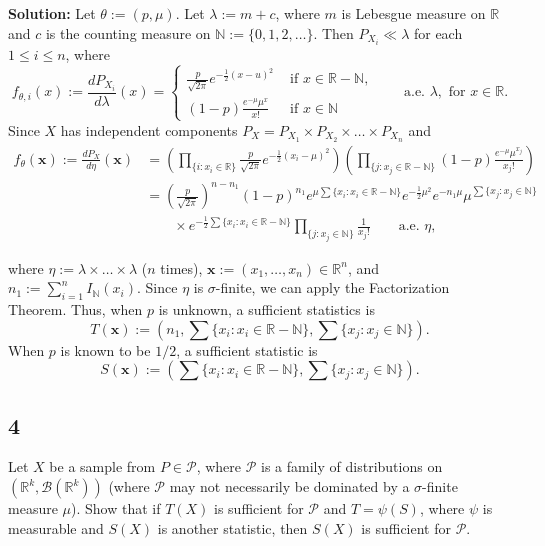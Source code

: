 \documentclass[12pt]{article}
\begin{document}
{\bf Solution:}
Let $\theta := (p, \mu)$. Let $\lambda := m + c$, where $m$ is Lebesgue measure on $\mathbb{R}$ and $c$ is the counting measure on $\mathbb{N} := \{0, 1, 2, \dots\}$.
Then $P_{X_{i}} \ll \lambda$ for each $1 \leq i \leq n$, where 
\[
  f_{\theta, i}(x) := \frac{dP_{X_{i}}}{d\lambda}(x) = \left\{ \begin{array}{cl} 
      \frac{p}{\sqrt{2\pi}}e^{-\frac{1}{2}(x-u)^{2}} & \text{ if } x \in \mathbb{R} - \mathbb{N}, \\
      (1-p)\frac{e^{-\mu}\mu^{x}}{x!} & \text{ if } x \in \mathbb{N}
  \end{array} \right. \qquad \text{a.e. }\lambda, \text{ for }x \in \mathbb{R}.
\]
Since $X$ has independent components $P_{X} = P_{X_{1}} \times P_{X_{2}} \times \dots \times P_{X_{n}}$ and 
\begin{align*}
  f_{\theta}(\bm{x}) := \frac{dP_{X}}{d\eta}(\bm{x}) & = \left( \prod_{\{i : x_{i} \in \mathbb{R}\}}\frac{p}{\sqrt{2\pi}}e^{-\frac{1}{2}(x_{i} -
  \mu)^{2}} \right)
  \left( \prod_{\{j : x_{j} \in \mathbb{R}-\mathbb{N}\}}(1-p)\frac{e^{-\mu}\mu^{x_{j}}}{x_{j}!} \right) \\
  & = \left( \frac{p}{\sqrt{2\pi}} \right)^{n - n_{1}}(1-p)^{n_{1}}e^{\mu\sum\{x_{i} : x_{i} \in \mathbb{R}-\mathbb{N}\}}e^{ - \frac{1}{2}\mu^{2}}
  e^{-n_{1}\mu}\mu^{\sum\{x_{j}:x_{j}\in\mathbb{N}\}} \\
  & \qquad \times e^{-\frac{1}{2}\sum\{x_i : x_{i}\in\mathbb{R} - \mathbb{N}\}}\prod_{\{j : x_{j} \in \mathbb{N}\}}\frac{1}{x_{j}!}
  \qquad \text{a.e. }\eta, 
\end{align*}

where $\eta := \lambda \times \dots \times \lambda$ ($n$ times), $\bm{x} := (x_{1}, \dots, x_{n}) \in \mathbb{R}^{n}$, and $n_{1} :=
\sum_{i=1}^{n}I_{\mathbb{N}}(x_{i})$. Since $\eta$ is $\sigma$-finite, we can apply the Factorization Theorem. Thus, when $p$ is unknown, a sufficient
statistics is 
\[
  T(\bm{x}) := \left( n_{1}, \sum\{x_i : x_{i} \in \mathbb{R} - \mathbb{N}\}, \sum\{x_j : x_{j}\in\mathbb{N}\}\right).
\]
When $p$ is known to be $1/2$, a sufficient statistic is
\[
  S(\bm{x}) := \left( \sum\{x_i : x_{i} \in \mathbb{R} - \mathbb{N}\}, \sum\{x_j : x_{j}\in\mathbb{N}\}\right).
\]


\newpage
\subsection*{4}
\begin{tcolorbox}
  Let $X$ be a sample from $P\in\mathcal{P}$, where $\mathcal{P}$ is a family of distributions on $(\mathbb{R}^k,\mathcal{B}(\mathbb{R}^k))$ (where $\mathcal{P}$ may not necessarily be dominated by a $\sigma$-finite measure $\mu$).  Show that if $T(X)$ is sufficient for $\mathcal{P}$ and $T=\psi(S)$, where $\psi$ is measurable and $S(X)$ is another statistic, then $S(X)$ is sufficient for $\mathcal{P}$.
\end{tcolorbox}
\end{document}
